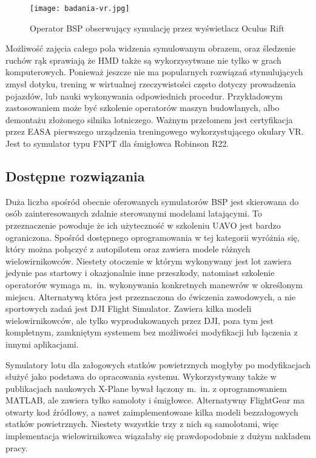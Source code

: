 \begin{figure}[!h]
    \centering \texttt{[image: badania-vr.jpg]}
    \caption{Operator BSP obserwujący symulację przez wyświetlacz Oculus Rift}
    \label{fig:badania-vr}
\end{figure}

Możliwość zajęcia całego pola widzenia symulowanym obrazem, oraz śledzenie ruchów rąk sprawiają że HMD także są wykorzysytwane nie tylko w grach komputerowych. Ponieważ jeszcze nie ma popularnych rozwiązań stymulujących zmysł dotyku, trening w wirtualnej rzeczywistości często dotyczy prowadzenia pojazdów, lub nauki wykonywania odpowiednich procedur. Przykładowym zastosowaniem może być szkolenie operatorów maszyn budowlanych\cite{cmlabs2021}, albo demontażu złożonego silnika lotniczego\cite{inlusion2020}. Ważnym przełomem jest certyfikacja przez EASA pierwszego urządzenia treningowego wykorzystującego okulary VR\cite{easavr2021}. Jest to symulator typu FNPT dla śmigłowca Robinson R22.

\subsection{Dostępne rozwiązania}
Duża liczba spośród obecnie oferowanych symulatorów BSP jest skierowana do osób zainteresowanych zdalnie sterowanymi modelami latającymi. To przeznaczenie powoduje że ich użyteczność w szkoleniu UAVO jest bardzo ograniczona. Spośród dostępnego oprogramowania w tej kategorii wyróżnia się\cite{realflight}, który można połączyć z autopilotem oraz zawiera modele różnych wielowirnikowców. Niestety otoczenie w którym wykonywany jest lot zawiera jedynie pas startowy i okazjonalnie inne przeszkody, natomiast szkolenie operatorów wymaga m.~in. wykonywania konkretnych manewrów w określonym miejscu. Alternatywą która jest przeznaczona do ćwiczenia zawodowych, a nie sportowych zadań jest DJI Flight Simulator\cite{djifs}. Zawiera kilka modeli wielowirnikowców, ale tylko wyprodukowanych przez DJI, poza tym jest kompletnym, zamkniętym systemem bez możliwości modyfikacji lub łączenia z innymi aplikacjami.

Symulatory lotu dla załogowych statków powietrznych mogłyby po modyfikacjach służyć jako podstawa do opracowania systemu. Wykorzystywany także w publikacjach naukowych X-Plane\cite{xplane} bywał łączony m.~in. z oprogramowaniem MATLAB, ale zawiera tylko samoloty i śmigłowce. Alternatywny FlightGear\cite{flightgear} ma otwarty kod źródłowy, a nawet zaimplementowane kilka modeli bezzałogowych statków powietrznych. Niestety wszystkie trzy z nich są samolotami, więc implementacja wielowirnikowca wiązałaby się prawdopodobnie z dużym nakładem pracy.

